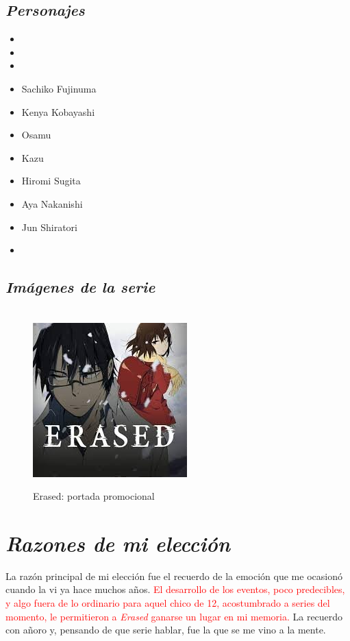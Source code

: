 \documentclass[A5paper, 11pt]{article}
\begin{document}
  \subsection{\textit{Personajes}}
\begin{itemize}
    \item {}
    \item {}
    \item {}
    \item Sachiko Fujinuma
    \item Kenya Kobayashi
    \item Osamu 
    \item Kazu 
    \item Hiromi Sugita
    \item Aya Nakanishi
    \item Jun Shiratori
    \item {}
\end{itemize}

\newpage
  \subsection{\textit{Im\'agenes de la serie}}
  
  \begin{figure}
     \begin{flushright}
      \caption*{Erased: portada promocional}\\
      
      \includegraphics[scale=0.008, angle=15]{images (1).jpg}
    \end{flushright}
  \end{figure}



\section{\emph{Razones de mi elecci\'on}}
La raz\'on principal de mi elecci\'on fue el recuerdo de la emoci\'on que me ocasion\'o cuando la vi ya hace muchos a\~nos. \textcolor{red}{El desarrollo de los eventos, poco predecibles, y algo fuera de lo ordinario para aquel chico de 12, acostumbrado a series del momento, le permitieron a \emph{Erased} ganarse un lugar en mi memoria.} La recuerdo con a\~noro y, pensando de que serie hablar, fue la que se me vino a la mente.
\end{document}
